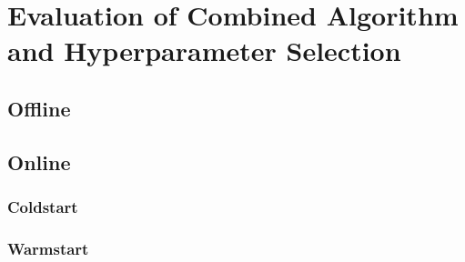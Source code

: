\chapter{Evaluation of Combined Algorithm and Hyperparameter Selection}

\section{Offline}

\section{Online}

\subsection{Coldstart}

\subsection{Warmstart}
